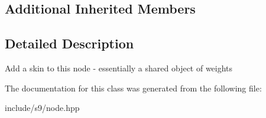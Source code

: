 \subsection*{Additional Inherited Members}


\subsection{Detailed Description}
Add a skin to this node -\/ essentially a shared object of weights 

The documentation for this class was generated from the following file\-:\begin{DoxyCompactItemize}
\item 
include/s9/node.\-hpp\end{DoxyCompactItemize}
